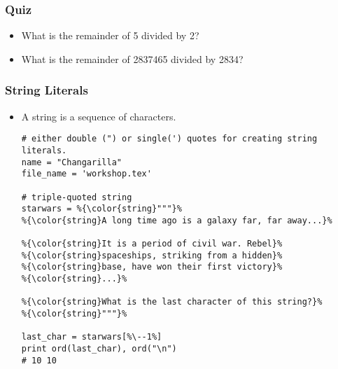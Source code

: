 \documentclass{beamer}
\begin{document}
\begin{frame}[fragile]
\frametitle{Quiz}
\begin{itemize}
\item What is the remainder of 5 divided by 2?
\item What is the remainder of 2837465 divided by 2834?
\end{itemize}
\end{frame}

\begin{frame}[fragile]
\frametitle{String Literals}
\begin{itemize}
\item A string is a sequence of characters.
\begin{lstlisting}[escapechar=\%]
# either double (") or single(') quotes for creating string literals.
name = "Changarilla"
file_name = 'workshop.tex'

# triple-quoted string
starwars = %{\color{string}"""}%
%{\color{string}A long time ago is a galaxy far, far away...}%

%{\color{string}It is a period of civil war. Rebel}%
%{\color{string}spaceships, striking from a hidden}%
%{\color{string}base, have won their first victory}%
%{\color{string}...}%

%{\color{string}What is the last character of this string?}%
%{\color{string}"""}%

last_char = starwars[%\--1%]
print ord(last_char), ord("\n")
# 10 10
\end{lstlisting}
\end{itemize}
\end{frame}
\end{document}
